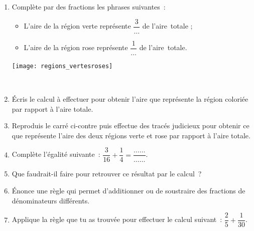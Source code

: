 \newpage

\begin{activite}

\begin{enumerate}
 \item Complète par des fractions les phrases suivantes :
 
 \begin{minipage}[c]{0.68\linewidth}
 \begin{itemize}
  \item L'aire de la région verte représente $\dfrac{3}{\ldots}$ de l'aire totale ;
  \vspace{0.3cm}
  \item L'aire de la région rose représente $\dfrac{1}{\ldots}$ de l'aire totale.
  \end{itemize}
  \end{minipage} \hfill%
  \begin{minipage}[c]{0.28\linewidth}
  \texttt{[image: regions\_vertesroses]}
   \end{minipage} \\
 \item Écris le calcul à effectuer pour obtenir l'aire que représente la région coloriée par rapport à l'aire totale.
 \item Reproduis le carré ci-contre puis effectue des tracés judicieux pour obtenir ce que représente l'aire des deux régions verte et rose par rapport à l'aire totale. 
 \item Complète l'égalité suivante : $\dfrac{3}{16} + \dfrac{1}{4} = \dfrac{\ldots \ldots}{\ldots \ldots}$.
 \vspace{0.2cm}
 \item Que faudrait-il faire pour retrouver ce résultat par le calcul ?
 \item Énonce une règle qui permet d'additionner ou de soustraire des fractions de dénominateurs différents. 
 \item Applique la règle que tu as trouvée pour effectuer le calcul suivant : $\dfrac{2}{5} + \dfrac{1}{30}$.
\end{enumerate}

\end{activite}

